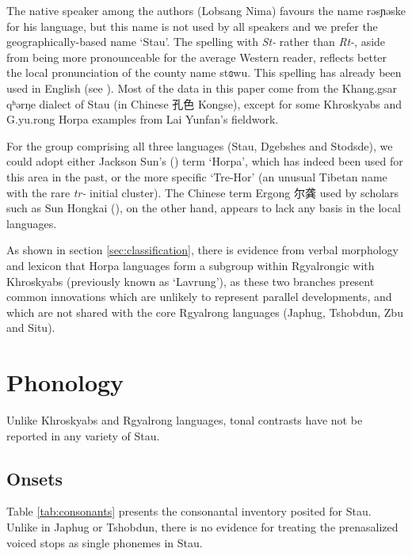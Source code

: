 \documentclass[oneside,a4paper,11pt]{article}
\newcommand{\ipa}[1]{{\phon #1}} %
\newcommand{\zh}[1]{{\cn #1}}
\begin{document}
  The native speaker among the authors (Lobsang Nima) favours the name \ipa{rəsɲəske} for his language, but this name is not used by all speakers and we prefer the geographically-based name  `Stau'. The spelling with \textit{St-} rather than \textit{Rt-}, aside from being more pronounceable for the average Western reader, reflects better the local pronunciation of the county name \ipa{stɞwu}. This spelling has already been used in English (see \citealt{wang70stau}).   Most of the data in this paper come from the Khang.gsar \ipa{qʰərŋe} dialect of Stau (in Chinese \zh{孔色} Kongse), except for some Khroskyabs and G.yu.rong Horpa examples from Lai Yunfan's fieldwork.
  
For the group comprising all three languages (Stau, Dgebshes and Stodsde),  we could adopt either Jackson Sun's 
(\citeyear{jackson00sidaba}) term `Horpa', which has indeed been used for this area in the past, or the more specific `Tre-Hor' (an unusual Tibetan name with the rare \textit{tr-} initial cluster).  The Chinese term Ergong \zh{尔龚} used by scholars such as Sun Hongkai (\citeyear{sun83liujiang}), on the other hand, appears to lack any basis in the local languages.
 
As shown in section \ref{sec:classification}, there is evidence from verbal morphology and lexicon that Horpa languages form a subgroup within Rgyalrongic with Khroskyabs (previously known as `Lavrung'), as these two branches present common innovations which are unlikely to represent parallel developments, and which are not shared with the core Rgyalrong languages (Japhug, Tshobdun, Zbu and Situ).
 
\section{Phonology}
Unlike Khroskyabs and Rgyalrong languages, tonal contrasts have not be reported in any variety of Stau.
 
  \subsection{Onsets}
  Table \ref{tab:consonants} presents the consonantal inventory posited for Stau. Unlike in Japhug or Tshobdun, there is no evidence for treating the prenasalized voiced stops as single phonemes in Stau.
  
\end{document}
